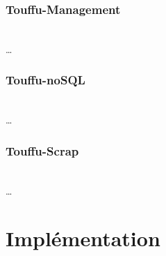 \documentclass[conference]{IEEEtran}
\begin{document}
\subsubsection*{Touffu-Management}
\hfil\\
…\\

\subsubsection*{Touffu-noSQL}
\hfil\\
…\\

\subsubsection*{Touffu-Scrap}
\hfil\\
…\\

\section{Implémentation}
\end{document}
